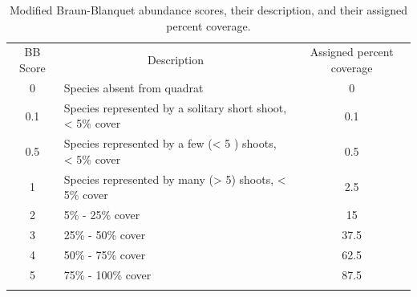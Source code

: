 \begin{table}[h]
  \centering
  \caption{Modified Braun-Blanquet abundance scores, their description, and their assigned percent coverage.}
    \begin{tabular}{clc}
\hline\noalign{\smallskip}

    BB Score & \multicolumn{1}{c}{Description} & \multicolumn{1}{p{12em}}{\centering Assigned percent coverage} \\
    \noalign{\smallskip}\hline\noalign{\smallskip}
    0     & Species absent from quadrat & 0 \\

    0.1   & Species represented by a solitary short shoot, \textless{} 5\% cover  & 0.1 \\

    0.5   & Species represented by a few (\textless{} 5 ) shoots, \textless{} 5\% cover  & 0.5 \\

    1     & Species represented by many  (\textgreater{} 5)  shoots, \textless{} 5\% cover & 2.5 \\

    2     & 5\% - 25\% cover  & 15 \\

    3     & 25\% - 50\% cover  & 37.5 \\

    4     & 50\% - 75\% cover  & 62.5 \\

    5     & 75\% - 100\% cover  & 87.5 \\
        \noalign{\smallskip}\hline\noalign{\smallskip}
    \end{tabular}%
  \label{app:bbscore}%
\end{table}%







